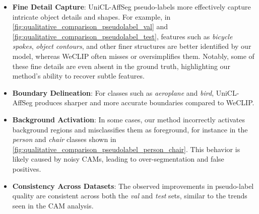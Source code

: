 \begin{itemize}
    \item \textbf{Fine Detail Capture}: UniCL-AffSeg pseudo-labels more effectively capture intricate object details and shapes. For example, in \autoref{fig:qualitative_comparison_pseudolabel_val} and \autoref{fig:qualitative_comparison_pseudolabel_test}, features such as \textit{bicycle spokes}, \textit{object contours}, and other finer structures are better identified by our model, whereas WeCLIP often misses or oversimplifies them. Notably, some of these fine details are even absent in the ground truth, highlighting our method's ability to recover subtle features.
    
    \item \textbf{Boundary Delineation}: For classes such as \textit{aeroplane} and \textit{bird}, UniCL-AffSeg produces sharper and more accurate boundaries compared to WeCLIP.
    
    \item \textbf{Background Activation}: In some cases, our method incorrectly activates background regions and misclassifies them as foreground, for instance in the \textit{person} and \textit{chair} classes shown in \autoref{fig:qualitative_comparison_pseudolabel_person_chair}. This behavior is likely caused by noisy CAMs, leading to over-segmentation and false positives.
    
    \item \textbf{Consistency Across Datasets}: The observed improvements in pseudo-label quality are consistent across both the \textit{val} and \textit{test} sets, similar to the trends seen in the CAM analysis.
\end{itemize}





